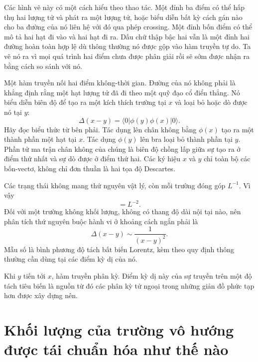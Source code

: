 Các hình vẽ này có một cách hiểu theo thao tác. Một đỉnh ba điểm có thể hấp thụ hai lượng tử và phát ra một lượng tử, hoặc biểu diễn bất kỳ cách gán nào cho ba đường của nó liên hệ với đó qua phép crossing. Một đỉnh bốn điểm có thể mô tả hai hạt đi vào và hai hạt đi ra. Dấu chữ thập bậc hai vẫn là một đỉnh hai đường hoàn toàn hợp lệ dù thông thường nó được gộp vào hàm truyền tự do. Ta vẽ nó ra vì mọi quá trình hai điểm chưa được phân giải rồi sẽ sớm được nhận ra bằng cách so sánh với nó.

Một hàm truyền nối hai điểm không-thời gian. Đường của nó không phải là khẳng định rằng một hạt lượng tử đã đi theo một quỹ đạo cổ điển thẳng. Nó biểu diễn biên độ để tạo ra một kích thích trường tại \(x\) và loại bỏ hoặc dò được nó tại \(y\):
\begin{equation}
\Delta(x-y)=\langle0|\phi(y)\phi(x)|0\rangle.
\label{eq:position-propagator}
\end{equation}
Hãy đọc biểu thức từ bên phải. Tác dụng lên chân không bằng \(\phi(x)\) tạo ra một thành phần một hạt tại \(x\). Tác dụng \(\phi(y)\) lên bra loại bỏ thành phần tại \(y\). Phần tử ma trận chân không của chúng là biên độ chồng lấp giữa sự tạo ra ở điểm thứ nhất và sự dò được ở điểm thứ hai. Các ký hiệu \(x\) và \(y\) chỉ toàn bộ các bốn-vectơ, không chỉ đơn thuần là hai tọa độ Descartes.

Các trạng thái không mang thứ nguyên vật lý, còn mỗi trường đóng góp \(L^{-1}\). Vì vậy
\begin{equation}
[\Delta]=L^{-2}.
\end{equation}
Đối với một trường không khối lượng, không có thang độ dài nội tại nào, nên phân tích thứ nguyên buộc hành vi ở khoảng cách ngắn phải là
\begin{equation}
\Delta(x-y)\sim\frac{1}{(x-y)^2}.
\label{eq:massless-propagator}
\end{equation}
Mẫu số là bình phương độ tách bất biến Lorentz, kèm theo quy định thông thường cần dùng tại các điểm kỳ dị của nó.

Khi \(y\) tiến tới \(x\), hàm truyền phân kỳ. Điểm kỳ dị này của sự truyền trên một độ tách tiêu biến là nguồn từ đó các phân kỳ tử ngoại trong những giản đồ phức tạp hơn được xây dựng nên.

\section{Khối lượng của trường vô hướng được tái chuẩn hóa như thế nào}

